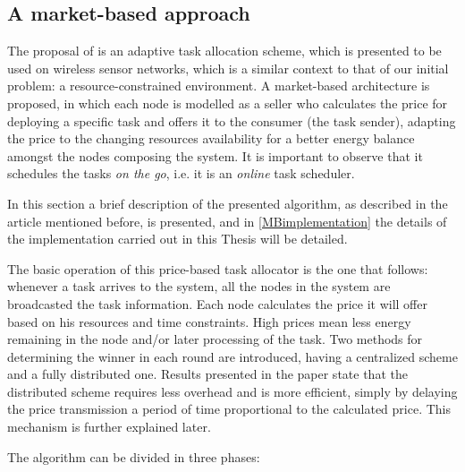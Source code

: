 \subsection{A market-based approach}
\label{sec_MBdescription}

The proposal of \cite{Edalat09} is an adaptive task allocation scheme, which is presented to be used on wireless sensor networks, which is a similar context to that of our initial problem: a resource-constrained environment. A market-based architecture is proposed, in which each node is modelled as a seller who calculates the price for deploying a specific task and offers it to the consumer (the task sender), adapting the price to the changing resources availability for a better energy balance amongst the nodes composing the system. It is important to observe that it schedules the tasks \emph{on the go}, i.e. it is an \emph{online} task scheduler.

In this section a brief description of the presented algorithm, as described in the article mentioned before, is presented, and in \ref{MBimplementation} the details of the implementation carried out in this Thesis will be detailed.

The basic operation of this price-based task allocator is the one that follows: whenever a task arrives to the system, all the nodes in the system are broadcasted the task information. Each node calculates the price it will offer based on his resources and time constraints. High prices mean less energy remaining in the node and/or later processing of the task. Two methods for determining the winner in each round are introduced, having a centralized scheme and a fully distributed one. Results presented in the paper state that the distributed scheme requires less overhead and is more efficient, simply by delaying the price transmission a period of time proportional to the calculated price. This mechanism is further explained later.

The algorithm can be divided in three phases:

